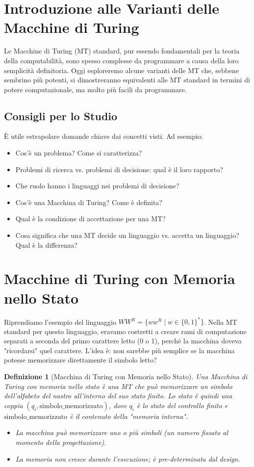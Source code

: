 \documentclass[a4paper, 11pt]{book} %
\newtheorem{definition}[theorem]{Definizione}
\theoremstyle{definition}
\begin{document}
\section{Introduzione alle Varianti delle Macchine di Turing}
Le Macchine di Turing (MT) standard, pur essendo fondamentali per la teoria della computabilità, sono spesso complesse da programmare a causa della loro semplicità definitoria. Oggi esploreremo alcune varianti delle MT che, sebbene sembrino più potenti, si dimostreranno equivalenti alle MT standard in termini di potere computazionale, ma molto più facili da programmare.

\subsection{Consigli per lo Studio}
È utile estrapolare domande chiave dai concetti visti. Ad esempio:
\begin{itemize}
    \item Cos'è un problema? Come si caratterizza?
    \item Problemi di ricerca vs. problemi di decisione: qual è il loro rapporto?
    \item Che ruolo hanno i linguaggi nei problemi di decisione?
    \item Cos'è una Macchina di Turing? Come è definita?
    \item Qual è la condizione di accettazione per una MT?
    \item Cosa significa che una MT decide un linguaggio vs. accetta un linguaggio? Qual è la differenza?
\end{itemize}

\section{Macchine di Turing con Memoria nello Stato}
Riprendiamo l'esempio del linguaggio $WW^R = \{w w^R \mid w \in \{0,1\}^*\}$. Nella MT standard per questo linguaggio, eravamo costretti a creare rami di computazione separati a seconda del primo carattere letto (0 o 1), perché la macchina doveva "ricordarsi" quel carattere. L'idea è: non sarebbe più semplice se la macchina potesse memorizzare direttamente il simbolo letto?

\begin{definition}[Macchina di Turing con Memoria nello Stato]
Una Macchina di Turing con memoria nello stato è una MT che può memorizzare un simbolo dell'alfabeto del nastro all'interno del suo stato finito. Lo stato è quindi una coppia $(q_i, \text{simbolo\_memorizzato})$, dove $q_i$ è lo stato del controllo finito e $\text{simbolo\_memorizzato}$ è il contenuto della "memoria interna".
\begin{itemize}
    \item La macchina può memorizzare uno o più simboli (un numero fissato al momento della progettazione).
    \item La memoria non cresce durante l'esecuzione; è pre-determinata dal design.
\end{itemize}
\end{definition}
\end{document}
